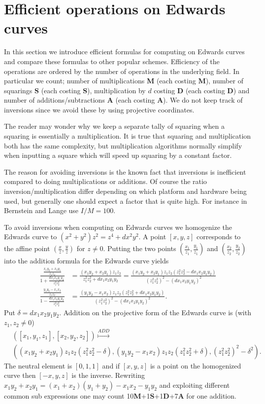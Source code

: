 \section{Efficient operations on Edwards curves}\label{sec:effAddandAna}
In this section we introduce efficient formulas for computing on Edwards curves and compare these formulas to other popular schemes. Efficiency of the operations are ordered by the number of operations in the underlying field. In particular we count; number of multiplications \textbf{M} (each costing \textbf{M}), number of squarings \textbf{S} (each costing \textbf{S}), multiplication by $d$ costing \textbf{D} (each costing \textbf{D}) and number of additions/subtractions \textbf{A} (each costing \textbf{A}). We do not keep track of inversions since we avoid these by using projective coordinates. 

The reader may wonder why we keep a separate tally of squaring when a squaring is essentially a multiplication. It is true that squaring and multiplication both has the same complexity, but multiplication algorithms normally simplify when inputting a square which will speed up squaring by a constant factor. 

The reason for avoiding inversions is the known fact that inversions is inefficient compared to doing multiplications or additions. Of course the ratio inversion/multiplication differ depending on which platform and hardware being used, but generally one should expect a factor that is quite high. For instance in \cite{EFD} Bernstein and Lange use $I/M=100$.

To avoid inversions when computing on Edwards curves we homogenize the Edwards curve to $(x^2+y^2)z^2=z^4+dx^2y^2$. A point $[x,y,z]$ corresponds to the affine point $\left(\frac{x}{z},\frac{y}{z}\right)$ for $z\neq 0$. Putting the two points $\left(\frac{x_1}{z_1},\frac{y_1}{z_1}\right)$ and $\left(\frac{x_2}{z_2},\frac{y_2}{z_2}\right)$ into the addition formula for the Edwards curve yields
\begin{align*}
\frac{\frac{x_1y_2+x_2y_1}{z_1z_2}}{1+\frac{dx_1x_2y_1y_2}{z_1^2z_2^2}} &= \frac{(x_1y_2+x_2y_1)z_1z_2}{z_1^2z_2^2+dx_1x_2y_1y_2} =  \frac{(x_1y_2+x_2y_1)z_1z_2(z_1^2z_2^2-dx_1x_2y_1y_2)}{(z_1^2z_2^2)^2-(dx_1x_2y_1y_2)^2} \\
\frac{\frac{y_1y_2-x_1x_2}{z_1z_2}}{1-\frac{dx_1x_2y_1y_2}{z_1^2z_2^2}} &=\frac{(y_1y_2-x_1x_2)z_1z_2(z_1^2z_2^2+dx_1x_2y_1y_2)}{(z_1^2z_2^2)^2-(dx_1x_2y_1y_2)^2}.
\end{align*}
Put $\delta = dx_1x_2y_1y_2$. Addition on the projective form of the Edwards curve is (with $z_1,z_2\neq 0$)
\begin{align*}
&\left([x_1,y_1,z_1],[x_2,y_2,z_2]\right)\overset{ADD}\mapsto \\ 
&\left( (x_1y_2+x_2y_1)z_1z_2(z_1^2z_2^2-\delta),(y_1y_2-x_1x_2)z_1z_2(z_1^2z_2^2+\delta),(z_1^2z_2^2)^2-\delta^2\right).
\end{align*}
The neutral element is $[0,1,1]$ and if $[x,y,z]$ is a point on the homogenized curve then $[-x,y,z]$ is the inverse. Rewriting $x_1y_2+x_2y_1=(x_1+x_2)(y_1+y_2)-x_1x_2-y_1y_2$ and exploiting    different common sub expressions one may count 10\textbf{M}+1\textbf{S}+1\textbf{D}+7\textbf{A} for one addition.

